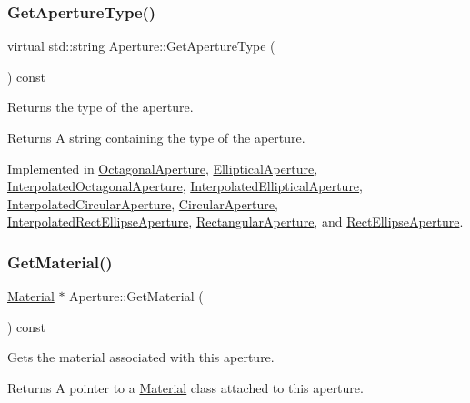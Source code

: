 \subsubsection{\texorpdfstring{Get\+Aperture\+Type()}{GetApertureType()}}
{\footnotesize\ttfamily virtual std\+::string Aperture\+::\+Get\+Aperture\+Type (\begin{DoxyParamCaption}{ }\end{DoxyParamCaption}) const\hspace{0.3cm}{\ttfamily [pure virtual]}}

Returns the type of the aperture. \begin{DoxyReturn}{Returns}
A string containing the type of the aperture. 
\end{DoxyReturn}


Implemented in \hyperlink{classOctagonalAperture_ada756a63c21912b26d79a5743bbd051f}{Octagonal\+Aperture}, \hyperlink{classEllipticalAperture_a8c56e3ab5e8483dd42ed6e35855409df}{Elliptical\+Aperture}, \hyperlink{classInterpolatedOctagonalAperture_a9e16536001e2732bcaf15d55134e05bf}{Interpolated\+Octagonal\+Aperture}, \hyperlink{classInterpolatedEllipticalAperture_a02a87b57b089796ccf55c9bbe16a11ec}{Interpolated\+Elliptical\+Aperture}, \hyperlink{classInterpolatedCircularAperture_ad6c2112ec4e0bd1b21b679e3fab08704}{Interpolated\+Circular\+Aperture}, \hyperlink{classCircularAperture_a18f05ba1dde35881014ba3aa2ed693bc}{Circular\+Aperture}, \hyperlink{classInterpolatedRectEllipseAperture_a310886ba54e5ea6a4e95d8946c9a7440}{Interpolated\+Rect\+Ellipse\+Aperture}, \hyperlink{classRectangularAperture_ac7d8e273423b18e1898286a51e3f22c7}{Rectangular\+Aperture}, and \hyperlink{classRectEllipseAperture_a983dec943872b82aa91f74cd10558207}{Rect\+Ellipse\+Aperture}.

\mbox{\label{classAperture_ae75acab11fe8687836cd71afe80e9dd2}} 
\subsubsection{\texorpdfstring{Get\+Material()}{GetMaterial()}}
{\footnotesize\ttfamily \hyperlink{classMaterial}{Material} $\ast$ Aperture\+::\+Get\+Material (\begin{DoxyParamCaption}{ }\end{DoxyParamCaption}) const}

Gets the material associated with this aperture. \begin{DoxyReturn}{Returns}
A pointer to a \hyperlink{classMaterial}{Material} class attached to this aperture. 
\end{DoxyReturn}
\mbox{\label{classAperture_ad0ea7907d393ec1e6a8303343fe9dd29}} 
